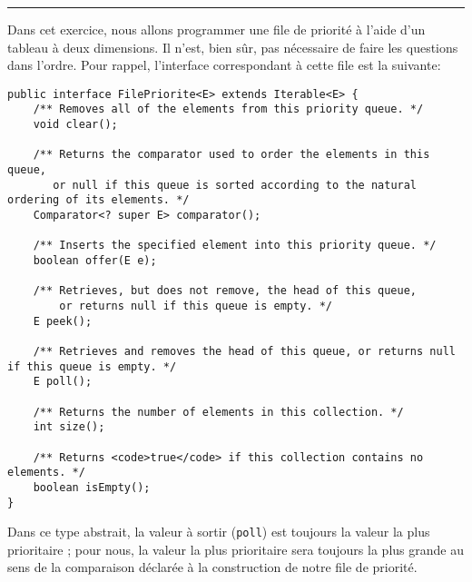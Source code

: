 \documentclass[iutinfo,10pt]{ustl-tdtp}
\date{\annee{2017}--\annee{2018}}
\begin{document}
\maketitle
\thispagestyle{empty}

\hrule

\begin{center}


\end{center}

Dans cet exercice, nous allons programmer une file de priorité à l'aide d'un tableau à deux dimensions. Il n'est, bien sûr, pas nécessaire de faire les questions dans l'ordre. Pour rappel, l'interface correspondant à cette file est la suivante:

\begin{verbatim}
public interface FilePriorite<E> extends Iterable<E> {
    /** Removes all of the elements from this priority queue. */
    void clear();
	
    /** Returns the comparator used to order the elements in this queue, 
       or null if this queue is sorted according to the natural ordering of its elements. */
    Comparator<? super E> comparator();

    /** Inserts the specified element into this priority queue. */
    boolean offer(E e);

    /** Retrieves, but does not remove, the head of this queue, 
        or returns null if this queue is empty. */
    E peek();

    /** Retrieves and removes the head of this queue, or returns null if this queue is empty. */
    E poll();

    /** Returns the number of elements in this collection. */
    int size();

    /** Returns <code>true</code> if this collection contains no elements. */
    boolean isEmpty();
}
\end{verbatim}

Dans ce type abstrait, la valeur à sortir (\texttt{poll}) est toujours la valeur la plus prioritaire ; pour nous, la valeur la plus prioritaire sera toujours la plus grande au sens de la comparaison déclarée à la construction de notre file de priorité.
\end{document}
